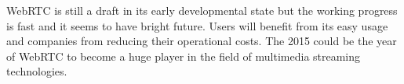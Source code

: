 WebRTC is still a draft in its early developmental state but the working progress is fast and it seems to have bright future. Users will benefit from its easy usage and companies from reducing their operational costs. The 2015 could be the year of WebRTC to become a huge player in the field of multimedia streaming technologies.
